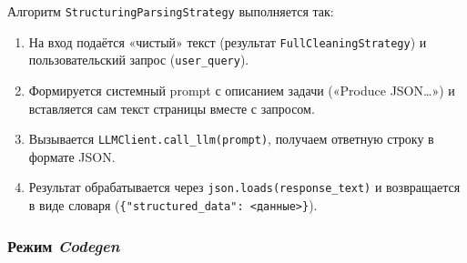 Алгоритм \texttt{StructuringParsingStrategy} выполняется так:
\begin{enumerate}
    \item На вход подаётся «чистый» текст (результат \texttt{FullCleaningStrategy}) и пользовательский запрос (\texttt{user\_query}).
    \item Формируется системный prompt с описанием задачи («Produce JSON…») и вставляется сам текст страницы вместе с запросом.
    \item Вызывается \texttt{LLMClient.call\_llm(prompt)}, получаем ответную строку в формате JSON.
    \item Результат обрабатывается через \texttt{json.loads(response\_text)} и возвращается в виде словаря (\texttt{\{"structured\_data": <данные>\}}).
\end{enumerate}

\subsubsection{Режим \emph{Codegen}}
\label{sssec:codegen}

